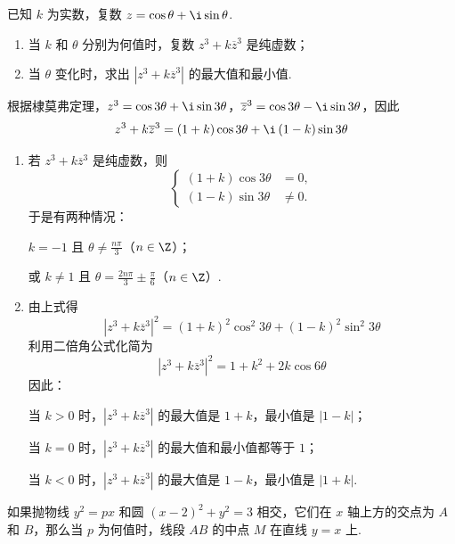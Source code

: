 \begin{problem}

已知 \(k\) 为实数，复数 \(z=\cos\theta+\i\sin\theta\).

\begin{enumerate}
\item 当 \(k\) 和 \(\theta\) 分别为何值时，复数 \(z^3+k\overline{z}^3\) 是纯虚数；
\item 当 \(\theta\) 变化时，求出 \(\left| z^3+k\overline{z}^3 \right|\) 的最大值和最小值.
\end{enumerate}
\end{problem}

\begin{solution}
根据棣莫弗定理，\(z^3=\cos 3\theta+\i\sin 3\theta\)，\(\overline{z}^3=\cos 3\theta-\i\sin 3\theta\)，因此
\[
z^3+k\overline{z}^3=\left( 1+k \right)\cos 3\theta+\i\left( 1-k \right)\sin 3\theta
\]

\begin{enumerate}
\item 若 \(z^3+k\overline{z}^3\) 是纯虚数，则
\[
\begin{cases}
\left( 1+k \right)\cos 3\theta&=0,\\
\left( 1-k \right)\sin 3\theta&\ne 0.
\end{cases}
\]
于是有两种情况：

\(k=-1\) 且 \(\theta\ne \frac{n\pi}{3}\)（\(n\in\Z\)）；

或 \(k\ne 1\) 且 \(\theta=\frac{2n\pi}{3}\pm \frac{\pi}{6}\)（\(n\in\Z\)）.

\item 由上式得
\[
\left| z^3+k\overline{z}^3 \right|^2=\left( 1+k \right)^2\cos^2 3\theta+\left( 1-k \right)^2\sin^2 3\theta
\]
利用二倍角公式化简为
\[
\left| z^3+k\overline{z}^3 \right|^2=1+k^2+2k\cos 6\theta
\]
因此：

当 \(k>0\) 时，\(\left| z^3+k\overline{z}^3 \right|\) 的最大值是 \(1+k\)，最小值是 \(|1-k|\)；

当 \(k=0\) 时，\(\left| z^3+k\overline{z}^3 \right|\) 的最大值和最小值都等于 \(1\)；

当 \(k<0\) 时，\(\left| z^3+k\overline{z}^3 \right|\) 的最大值是 \(1-k\)，最小值是 \(|1+k|\).
\end{enumerate}
\end{solution}

\begin{problem}

如果抛物线 \(y^2=px\) 和圆 \((x-2)^2+y^2=3\) 相交，它们在 \(x\) 轴上方的交点为 \(A\) 和 \(B\)，那么当 \(p\) 为何值时，线段 \(AB\) 的中点 \(M\) 在直线 \(y=x\) 上.

\end{problem}

